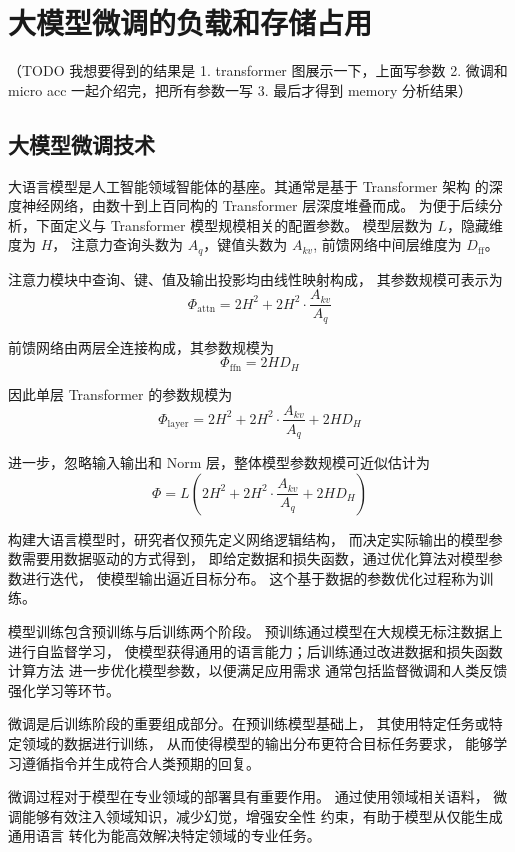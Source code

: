 \documentclass[bachelor,openany,oneside,color,AutoFakeBold=true]{buaathesis}
\begin{document}
\section{大模型微调的负载和存储占用}

（TODO 我想要得到的结果是
1. transformer 图展示一下，上面写参数
2. 微调和 micro acc 一起介绍完，把所有参数一写
3. 最后才得到 memory 分析结果）

\subsection{大模型微调技术}
大语言模型是人工智能领域智能体的基座。其通常是基于 Transformer 架构
的深度神经网络，由数十到上百同构的 Transformer 层深度堆叠而成。
为便于后续分析，下面定义与 Transformer 模型规模相关的配置参数。
模型层数为 $L$，隐藏维度为 $H$，
注意力查询头数为 $A_q$，键值头数为 $A_{kv}$,
前馈网络中间层维度为 $D_{\mathrm{ff}}$。

注意力模块中查询、键、值及输出投影均由线性映射构成，
其参数规模可表示为
\[
\Phi_{\mathrm{attn}} =
2H^2 + 2H^2 \cdot \frac{A_{kv}}{A_q}
\]

前馈网络由两层全连接构成，其参数规模为
\[
\Phi_{\mathrm{ffn}} = 2H D_H
\]

因此单层 Transformer 的参数规模为
\[
\Phi_{\mathrm{layer}} =
2H^2 + 2H^2 \cdot \frac{A_{kv}}{A_q} + 2H D_H
\]

进一步，忽略输入输出和 Norm 层，整体模型参数规模可近似估计为
\[
\Phi = L\left(2H^2 + 2H^2 \cdot \frac{A_{kv}}{A_q} + 2H D_H\right)
\]



构建大语言模型时，研究者仅预先定义网络逻辑结构，
而决定实际输出的模型参数需要用数据驱动的方式得到，
即给定数据和损失函数，通过优化算法对模型参数进行迭代，
使模型输出逼近目标分布。
这个基于数据的参数优化过程称为训练。

模型训练包含预训练与后训练两个阶段。
预训练通过模型在大规模无标注数据上进行自监督学习，
使模型获得通用的语言能力；后训练通过改进数据和损失函数计算方法
进一步优化模型参数，以便满足应用需求
通常包括监督微调和人类反馈强化学习等环节。

微调是后训练阶段的重要组成部分。在预训练模型基础上，
其使用特定任务或特定领域的数据进行训练，
从而使得模型的输出分布更符合目标任务要求，
能够学习遵循指令并生成符合人类预期的回复。

微调过程对于模型在专业领域的部署具有重要作用。
通过使用领域相关语料，
微调能够有效注入领域知识，减少幻觉，增强安全性
约束，有助于模型从仅能生成通用语言
转化为能高效解决特定领域的专业任务。
\end{document}
